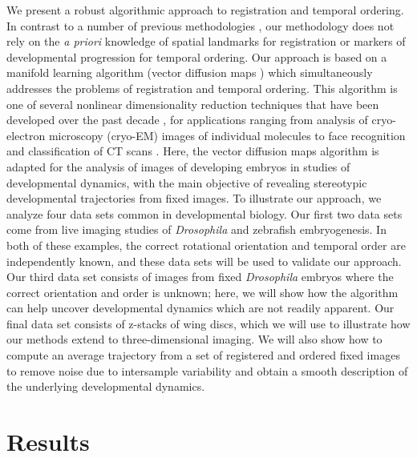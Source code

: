 \documentclass[twocolumn, 10pt]{article}
\begin{document}
We present a robust algorithmic approach to registration and temporal ordering.
%
In contrast to a number of previous methodologies \citep{zitova2003image, rowley1998rotation, hajnal2010medical, greenspan1994rotation, zhao2003face}, our methodology does not rely on the {\em a priori} knowledge of spatial landmarks for registration or markers of developmental progression for temporal ordering.
%
Our approach is based on a manifold learning algorithm (vector diffusion maps \citep{singer2012vector}) which simultaneously addresses the problems of registration and temporal ordering. 
%
This algorithm is one of several nonlinear dimensionality reduction techniques that have been developed over the past decade \citep{Belkin2003, coifman2005geometric, coifman2006geometric, tenenbaum2000global, roweis2000nonlinear}, for
applications ranging from analysis of cryo-electron microscopy (cryo-EM) images of individual molecules  \citep{zhao2014rotationally, singer2011viewing} to face recognition \citep{lafon2006data} and classification of CT scans \citep{fernandez2014diffusion}.
%
Here, the vector diffusion maps algorithm is adapted for the analysis of images of developing embryos in studies of developmental dynamics, with the main objective of revealing stereotypic developmental trajectories from fixed images.
%
To illustrate our approach, we analyze four data sets common in developmental biology. 
%
Our first two data sets come from live imaging studies of {\em Drosophila} and zebrafish embryogenesis.
%
In both of these examples, the correct rotational orientation and temporal order are independently known, and these data sets will be used to validate our approach.
%
Our third data set consists of images from fixed {\em Drosophila} embryos where the correct orientation and order is unknown; here, we will show how the algorithm can help uncover developmental dynamics which are not readily apparent. 
%
Our final data set consists of z-stacks of wing discs, which we will use to illustrate how our methods extend to three-dimensional imaging. 
%
We will also show how to compute an average trajectory from a set of registered and ordered fixed images to remove noise due to intersample variability and obtain a smooth description of the underlying developmental dynamics. 

\section*{Results}
\end{document}
